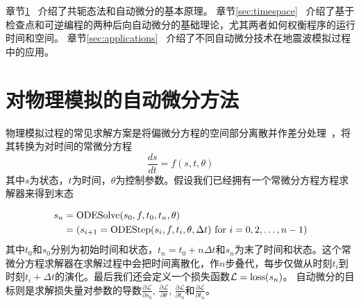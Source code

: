 \documentclass[A4,twoside,fontset=ubuntu,UTF8]{ctexart}
\begin{document}

章节\ref{sec:forwardbackward}~ 介绍了共轭态法和自动微分的基本原理。
章节\ref{sec:timespace}~ 介绍了基于检查点和可逆编程的两种后向自动微分的基础理论，尤其两者如何权衡程序的运行时间和空间。
章节\ref{sec:applications}~ 介绍了不同自动微分技术在地震波模拟过程中的应用。

\section{对物理模拟的自动微分方法}\label{sec:forwardbackward}

    物理模拟过程的常见求解方案是将偏微分方程的空间部分离散并作差分处理~\cite{Grote2010}，将其转换为对时间的常微分方程
    $$\frac{d s}{d t} = f(s, t, \theta)$$
其中$s$为状态，$t$为时间，$\theta$为控制参数。假设我们已经拥有一个常微分方程方程求解器来得到末态

\begin{align}
    \begin{split}
    s_n &= \text{ODESolve}(s_0, f, t_0, t_n, \theta)\\
        &= (s_{i+1} = {\rm ODEStep}(s_{i}, f, t_i, \theta, \Delta t) ~\text{for $i=0,2, \ldots, n-1$})
    \end{split}
\end{align}
其中$t_0$和$s_0$分别为初始时间和状态，$t_n=t_0+n\Delta t$和$s_n$为末了时间和状态。这个常微分方程求解器在求解过程中会把时间离散化，作$n$步叠代，每步仅做从时刻$t_i$到时刻$t_{i}+\Delta t$的演化。最后我们还会定义一个损失函数$\mathcal{L} = {\rm loss}(s_n)$。
    自动微分的目标则是求解损失量对参数的导数$\frac{\partial \mathcal{L}}{\partial s_0}$, $\frac{\partial \mathcal{L}}{\partial \theta}$, $\frac{\partial \mathcal{L}}{\partial t_0}$和$\frac{\partial \mathcal{L}}{\partial t_n}$。
\end{document}
